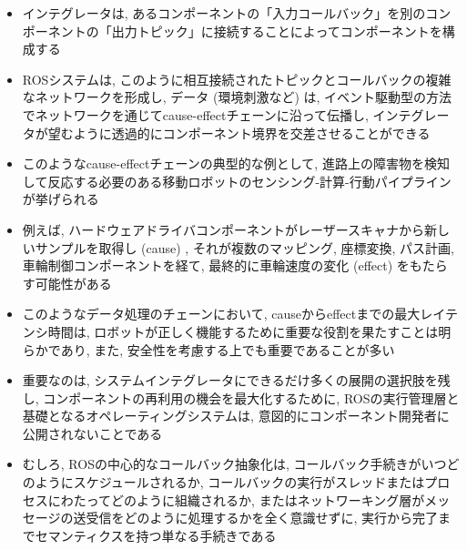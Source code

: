 \begin{frame}{}
    \begin{itemize}
        \item インテグレータは, あるコンポーネントの「入力コールバック」を別のコンポーネントの「出力トピック」に接続することによってコンポーネントを構成する
        \item ROSシステムは, このように相互接続されたトピックとコールバックの複雑なネットワークを形成し, データ (環境刺激など) は, イベント駆動型の方法でネットワークを通じてcause-effectチェーンに沿って伝播し, インテグレータが望むように透過的にコンポーネント境界を交差させることができる
    \end{itemize}
\end{frame}

\begin{frame}{}
    \begin{itemize}
        \item このようなcause-effectチェーンの典型的な例として, 進路上の障害物を検知して反応する必要のある移動ロボットのセンシング-計算-行動パイプラインが挙げられる
        \item 例えば, ハードウェアドライバコンポーネントがレーザースキャナから新しいサンプルを取得し (cause) , それが複数のマッピング, 座標変換, パス計画, 車輪制御コンポーネントを経て, 最終的に車輪速度の変化 (effect) をもたらす可能性がある
        \item このようなデータ処理のチェーンにおいて, causeからeffectまでの最大レイテンシ時間は, ロボットが正しく機能するために重要な役割を果たすことは明らかであり, また, 安全性を考慮する上でも重要であることが多い
    \end{itemize}
\end{frame}

\begin{frame}{}
    \begin{itemize}
        \item 重要なのは, システムインテグレータにできるだけ多くの展開の選択肢を残し, コンポーネントの再利用の機会を最大化するために, ROSの実行管理層と基礎となるオペレーティングシステムは, 意図的にコンポーネント開発者に公開されないことである
        \item むしろ, ROSの中心的なコールバック抽象化は, コールバック手続きがいつどのようにスケジュールされるか, コールバックの実行がスレッドまたはプロセスにわたってどのように組織されるか, またはネットワーキング層がメッセージの送受信をどのように処理するかを全く意識せずに, 実行から完了までセマンティクスを持つ単なる手続きである
    \end{itemize}
\end{frame}

